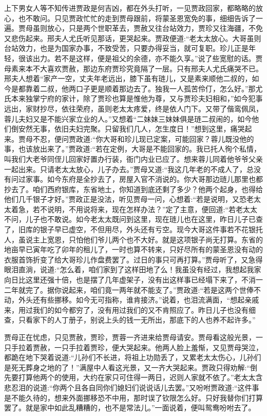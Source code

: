 \begin{parag}
    上下男女人等不知传进贾政是何吉凶，都在外头打听，一见贾政回家，都略略的放心，也不敢问。只见贾政忙忙的走到贾母跟前，将蒙圣恩宽免的事，细细告诉了一遍。贾母虽则放心，只是两个世职革去，贾赦又往台站效力，贾珍又往海疆，不免又悲伤起来。邢夫人尤氏听见那话，更哭起来。贾政便道:“老太太放心。大哥虽则台站效力，也是为国家办事，不致受苦，只要办得妥当，就可复职。珍儿正是年轻，很该出力。若不是这样，便是祖父的余德，亦不能久享。”说了些宽慰的话。贾母素来本不大喜欢贾赦，那边东府贾珍究竟隔了一层。只有邢夫人尤氏痛哭不已。邢夫人想着“家产一空，丈夫年老远出，膝下虽有琏儿，又是素来顺他二叔的，如今是都靠着二叔，他两口子更是顺着那边去了。独我一人孤苦伶仃，怎么好。”那尤氏本来独掌宁府的家计，除了贾珍也算是惟他为尊，又与贾珍夫妇相和，”如今犯事远出，家财抄尽，依往荣府，虽则老太太疼爱，终是依人门下。又带了偕鸾佩凤，蓉儿夫妇又是不能兴家立业的人。”又想着“二妹妹三妹妹俱是琏二叔闹的，如今他们倒安然无事，依旧夫妇完聚。只留我们几人，怎生度日！”想到这里，痛哭起来。贾母不忍，便问贾政道:“你大哥和珍儿现已定案，可能回家？蓉儿既没他的事，也该放出来了。”贾政道:“若在定例，大哥是不能回家的。我已托人徇个私情，叫我们大老爷同侄儿回家好置办行装，衙门内业已应了。想来蓉儿同着他爷爷父亲一起出来。只请老太太放心，儿子办去。”贾母又道:“我这几年老的不成人了，总没有问过家事。如今东府是全抄去了，房屋入官不消说的。你大哥那边琏儿那里也都抄去了。咱们西府银库，东省地土，你知道到底还剩了多少？他两个起身，也得给他们几千银子才好。”贾政正是没法，听见贾母一问，心想着:“若是说明，又恐老太太着急，若不说明，不用说将来，现在怎样办法？”定了主意，便回道:“若老太太不问，儿子也不敢说。如今老太太既问到这里，现在琏儿也在这里，昨日儿子已查了，旧库的银子早已虚空，不但用尽，外头还有亏空。现今大哥这件事若不花银托人，虽说主上宽恩，只怕他们爷儿两个也不大好。就是这项银子尚无打算。东省的地亩早已寅年吃了卯年的租儿了，一时也算不转来，只好尽所有的蒙圣恩没有动的衣服首饰折变了给大哥珍儿作盘费罢了。过日的事只可再打算。”贾母听了，又急得眼泪直淌，说道:“怎么着，咱们家到了这样田地了么！我虽没有经过，我想起我家向日比这里还强十倍，也是摆了几年虚架子，没有出这样事已经塌下来了，不消一二年就完了。据你说起来，咱们竟一两年就不能支了。”贾政道:“若是这两个世俸不动，外头还有些挪移。如今无可指称，谁肯接济。”说着，也泪流满面，“想起亲戚来，用过我们的如今都穷了，没有用过我们的又不肯照应了。昨日儿子也没有细查，只看家下的人丁册子，别说上头的钱一无所出，那底下的人也养不起许多。”
\end{parag}


\begin{parag}
    贾母正在忧虑，只见贾赦，贾珍，贾蓉一齐进来给贾母请安。贾母看这般光景，一只手拉着贾赦，一只手拉着贾珍，便大哭起来。他两人脸上羞惭，又见贾母哭泣，都跪在地下哭着说道:“儿孙们不长进，将祖上功勋丢了，又累老太太伤心，儿孙们是死无葬身之地的了！”满屋中人看这光景，又一齐大哭起来。贾政只得劝解:“倒先要打算他两个的使用，大约在家只可住得一两日，迟则人家就不依了。”老太太含悲忍泪的说道:“你两个且各自同你们媳妇们说说话儿去罢。”又吩咐贾政道:“这件事是不能久待的，想来外面挪移恐不中用，那时误了钦限怎么好。只好我替你们打算罢了。就是家中如此乱糟糟的，也不是常法儿。”一面说着，便叫鸳鸯吩咐去了。
\end{parag}


